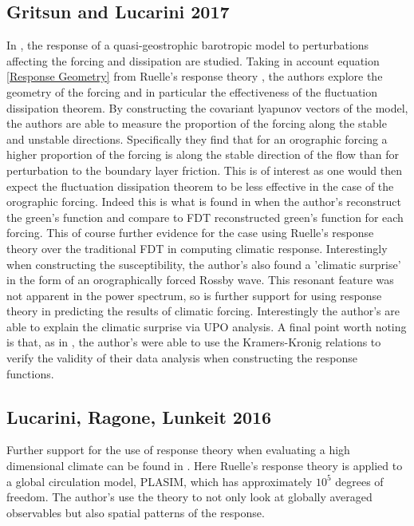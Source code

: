 \subsection{Gritsun and Lucarini 2017}

In \cite{Gritsun2017}, the response of a quasi-geostrophic barotropic model to perturbations affecting the forcing and dissipation are studied. Taking in account equation \ref{Response Geometry} from Ruelle's response theory \cite{Ruelle}, the authors explore the geometry of the forcing and in particular the effectiveness of the fluctuation dissipation theorem. By constructing the covariant lyapunov vectors of the model, the authors are able to measure the proportion of the forcing along the stable and unstable directions. Specifically they find that for an orographic forcing a higher proportion of the forcing is along the stable direction of the flow than for perturbation to the boundary layer friction. This is of interest as one would then expect the fluctuation dissipation theorem to be less effective in the case of the orographic forcing. Indeed this is what is found in \cite{Gritsun2017} when the author's reconstruct the green's function and compare to FDT reconstructed green's function for each forcing. This of course further evidence for the case using Ruelle's response theory over the traditional FDT in computing climatic response. Interestingly when constructing the susceptibility, the author's also found a 'climatic surprise' in the form of an orographically forced Rossby wave. This resonant feature was not apparent in the power spectrum, so is further support for using response theory in predicting the results of climatic forcing. Interestingly the author's are able to explain the climatic surprise via UPO analysis. A final point worth noting is that, as in \cite{Lucarini2011}, the author's were able to use the Kramers-Kronig relations to verify the validity of their data analysis when constructing the response functions.

\subsection{Lucarini, Ragone, Lunkeit 2016}

Further support for the use of response theory when evaluating a high dimensional climate can be found in \cite{Lucarini2017a}. Here Ruelle's response theory is applied to a global circulation model, PLASIM, which has approximately $10^5$ degrees of freedom. The author's use the theory to not only look at globally averaged observables but also spatial patterns of the response. \\


